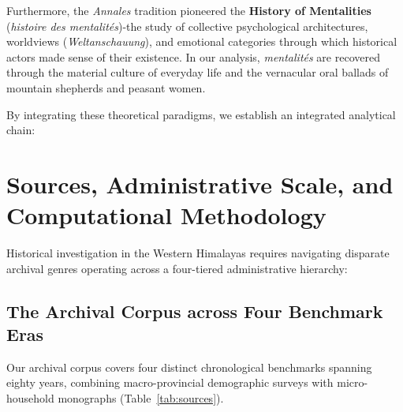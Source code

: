 \documentclass[11pt,a4paper]{article}
\begin{document}
Furthermore, the \textit{Annales} tradition pioneered the \textbf{History of Mentalities} (\textit{histoire des mentalit\'es})-the study of collective psychological architectures, worldviews (\textit{Weltanschauung}), and emotional categories through which historical actors made sense of their existence. In our analysis, \textit{mentalit\'es} are recovered through the material culture of everyday life and the vernacular oral ballads of mountain shepherds and peasant women.

By integrating these theoretical paradigms, we establish an integrated analytical chain:
\begin{center}
\small
{}
\end{center}

\section{Sources, Administrative Scale, and Computational Methodology}

Historical investigation in the Western Himalayas requires navigating disparate archival genres operating across a four-tiered administrative hierarchy:
\begin{center}
\small
{}
\end{center}

\subsection{The Archival Corpus across Four Benchmark Eras}
Our archival corpus covers four distinct chronological benchmarks spanning eighty years, combining macro-provincial demographic surveys with micro-household monographs (Table~\ref{tab:sources}).
\end{document}
